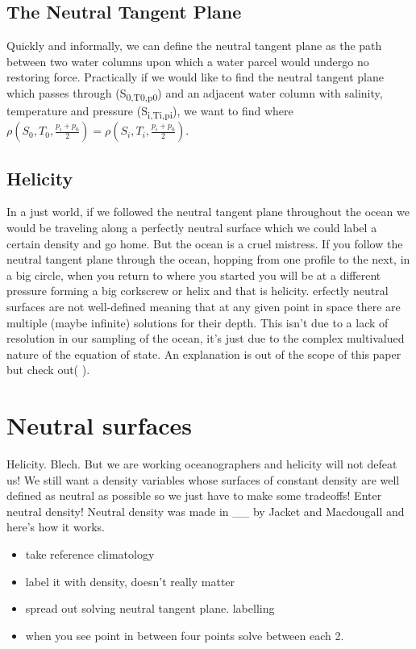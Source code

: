 \documentclass[11pt]{article}
\begin{document}
\subsection{The Neutral Tangent Plane}
\label{sec:org6bf6efc}
Quickly and informally, we can define the neutral tangent plane as the path between two water columns upon which a water parcel would undergo no restoring force. Practically if we would like to find the neutral tangent plane which passes through (S\textsubscript{0,T}\textsubscript{0,p}\textsubscript{0}) and an adjacent water column with salinity, temperature and pressure (S\textsubscript{i,T}\textsubscript{i,p}\textsubscript{i}), we want to find where \(\rho(S_0,T_0,\frac{p_i+p_0}{2})=\rho(S_i,T_i,\frac{p_i+p_0}{2})\). 

\subsection{Helicity}
\label{sec:orgede0fb0}
In a just world, if we followed the neutral tangent plane throughout the ocean we would be traveling along a perfectly neutral surface which we could label a certain density and go home. But the ocean is a cruel mistress. If you follow the neutral tangent plane through the ocean, hopping from one profile to the next, in a big circle, when you return to where you started you will be at a different pressure forming a big corkscrew or helix and that is helicity. erfectly neutral surfaces are not well-defined meaning that at any given point in space there are multiple (maybe infinite) solutions for their depth. This isn't due to a lack of resolution in our sampling of the ocean, it's just due to the complex multivalued nature of the equation of state. An explanation is out of the scope of this paper but check out( ).  

\section{Neutral surfaces}
\label{sec:org8eb907b}
Helicity. Blech. But we are working oceanographers and helicity will not defeat us! We still want a density variables whose surfaces of constant density are well defined as neutral as possible so we just have to make some tradeoffs! Enter neutral density! Neutral density was made in \_\_ by Jacket and Macdougall and here's how it works. 

\begin{itemize}
\item take reference climatology
\item label it with density, doesn't really matter
\item spread out solving neutral tangent plane. labelling
\item when you see point in between four points solve between each 2.
\end{itemize}
\end{document}
